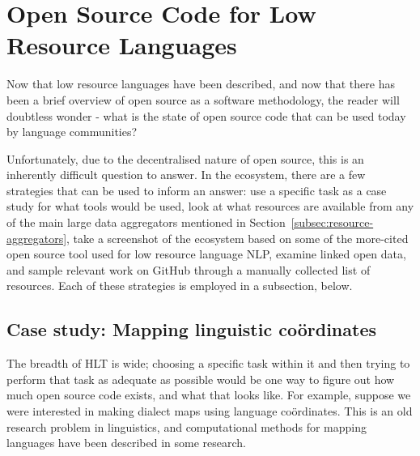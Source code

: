 \section{Open Source Code for Low Resource Languages}
\label{sec:endlangcode}

Now that low resource languages have been described, and now that there has been a brief overview of open source as a software methodology, the reader will doubtless wonder - what is the state of open source code that can be used today by language communities?


Unfortunately, due to the decentralised nature of open source, this is an inherently difficult question to answer. In the ecosystem, there are a few strategies that can be used to inform an answer: use a specific task as a case study for what tools would be used, look at what resources are available from any of the main large data aggregators mentioned in Section~\ref{subsec:resource-aggregators}, take a screenshot of the ecosystem based on some of the more-cited open source tool used for low resource language NLP, examine linked open data, and sample relevant work on GitHub through a manually collected list of resources. Each of these strategies is employed in a subsection, below.

\subsection{Case study: Mapping linguistic co\"ordinates}

The breadth of HLT is wide; choosing a specific task within it and then trying to perform that task as adequate as possible would be one way to figure out how much open source code exists, and what that looks like. For example, suppose we were interested in making dialect maps using language co\"ordinates. This is an old research problem in linguistics, and computational methods for mapping languages have been described in some research. %

